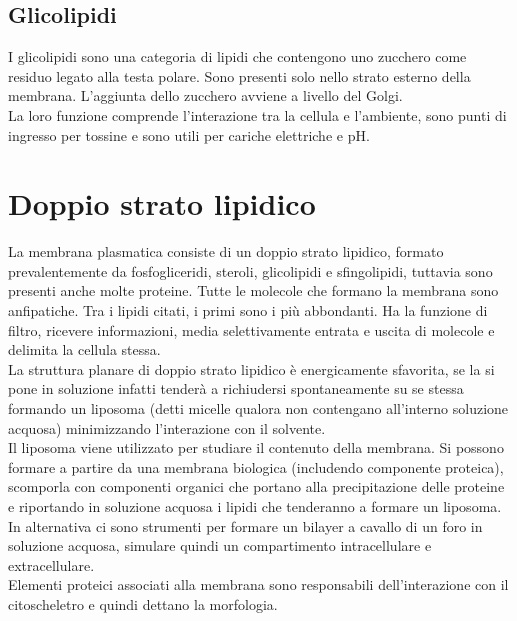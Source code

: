     \subsection{Glicolipidi}
        I glicolipidi sono una categoria di lipidi che contengono uno zucchero come residuo legato alla testa polare. Sono presenti solo nello strato esterno della membrana. L'aggiunta dello zucchero avviene a livello del Golgi. \\
        La loro funzione comprende l'interazione tra la cellula e l'ambiente, sono punti di ingresso per tossine e sono utili per cariche elettriche e pH.
    
\section{Doppio strato lipidico}
    La membrana plasmatica consiste di un doppio strato lipidico, formato prevalentemente da fosfogliceridi, steroli, glicolipidi e sfingolipidi, tuttavia sono presenti anche molte proteine. Tutte le molecole che formano la membrana sono anfipatiche. 
    Tra i lipidi citati, i primi sono i più abbondanti. Ha la funzione di filtro, ricevere informazioni, media selettivamente entrata e uscita di molecole e delimita la cellula stessa.\\
    La struttura planare di doppio strato lipidico è energicamente sfavorita, se la si pone in soluzione infatti tenderà a richiudersi spontaneamente su se stessa formando un liposoma (detti micelle qualora non contengano all'interno soluzione acquosa) minimizzando l'interazione con il solvente.\\
    Il liposoma viene utilizzato per studiare il contenuto della membrana. Si possono formare a partire da una membrana biologica (includendo componente proteica), scomporla con componenti organici che portano alla precipitazione delle proteine e riportando in soluzione acquosa i lipidi che tenderanno a formare un liposoma.
    In alternativa ci sono strumenti per formare un bilayer a cavallo di un foro in soluzione acquosa, simulare quindi un compartimento intracellulare e extracellulare.\\
    Elementi proteici associati alla membrana sono responsabili dell'interazione con il citoscheletro e quindi dettano la morfologia.\\
    
